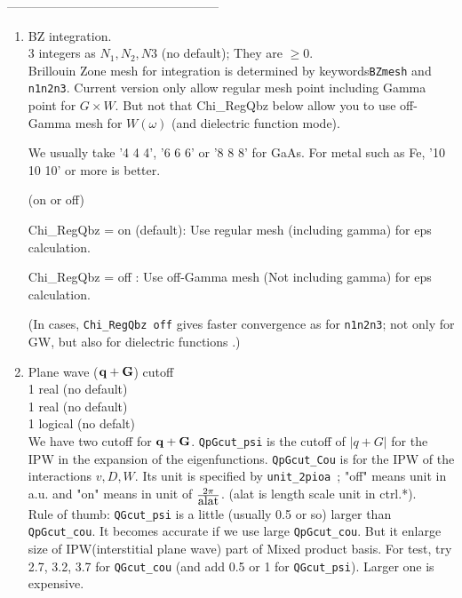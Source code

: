 {---------------------------------------------------\\
\begin{enumerate}
\item BZ integration.\\
 3 integers as $N_1,N_2,N3$ (no default); They are $\ge 0$. \\
Brillouin Zone mesh for integration
is determined by keywords{\tt BZmesh} and {\tt n1n2n3}. 
Current version only allow regular mesh point including Gamma point
for $G \times W$. But not that Chi\_RegQbz below allow you to use
off-Gamma mesh for $W(\omega)$ (and dielectric function mode).

We usually take '4 4 4', '6 6 6' or '8 8 8' for GaAs. 
For metal such as Fe, '10 10 10' or more is better.


 (on or off)

Chi\_RegQbz = on (default): Use regular mesh (including gamma) for eps calculation.

Chi\_RegQbz = off : Use off-Gamma mesh (Not including gamma) for eps calculation.

(In cases, {\tt Chi\_RegQbz off} gives faster convergence as for {\tt n1n2n3};
 not only for GW, but also for dielectric functions .)

\item 
Plane wave (${\bf q+G}$) cutoff  \\
 1 real (no default)\\
 1 real (no default)\\
 1 logical (no defalt)\\
We have two cutoff for ${\bf q+G}$.
{\tt QpGcut\_psi} is the cutoff of $|q+G|$ for the IPW 
in the expansion of the eigenfunctions.
{\tt QpGcut\_Cou} is for the IPW of the interactions $v,D,W$.
Its unit is specified by {\tt unit\_2pioa };
"off" means unit in a.u. and "on" means in unit of $\frac{2 \pi}{\mbox{\rm alat}}$.
(alat is length scale unit in {\sf ctrl.*}).\\

Rule of thumb:
     \verb+QGcut_psi+ is a little (usually 0.5 or so) larger than \verb+QpGcut_cou+.
     It becomes accurate if we use large \verb+QpGcut_cou+. 
     But it enlarge size of IPW(interstitial plane wave) part of Mixed
     product basis. For test, try  2.7, 3.2, 3.7 for \verb+QGcut_cou+
     (and add 0.5 or 1 for \verb+QGcut_psi+). Larger one is expensive.\\


\end{enumerate}}
